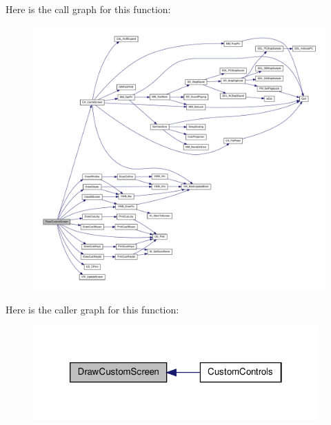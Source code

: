 Here is the call graph for this function:
\nopagebreak
\begin{figure}[H]
\begin{center}
\leavevmode
\includegraphics[width=400pt]{WL__MENU_8H_a2173c3a8943509f99cb5ac01f2a111a6_cgraph}
\end{center}
\end{figure}




Here is the caller graph for this function:
\nopagebreak
\begin{figure}[H]
\begin{center}
\leavevmode
\includegraphics[width=310pt]{WL__MENU_8H_a2173c3a8943509f99cb5ac01f2a111a6_icgraph}
\end{center}
\end{figure}


